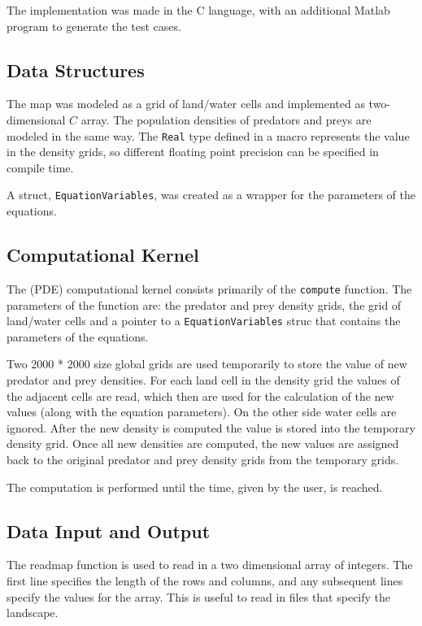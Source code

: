 \documentclass[12pt,a4paper]{article}
\begin{document}
The implementation was made in the C language, with an additional Matlab program to generate the test cases. 

\subsection{Data Structures}

The map was modeled as a grid of land/water cells and implemented as two-dimensional $C$ array. The population densities of predators and preys are modeled in the same way. The \texttt{Real} type defined in a macro represents the value in the density grids, so different floating point precision  can be specified in compile time. 

A struct, \texttt{EquationVariables}, was created as a wrapper for the parameters of the equations.

\subsection{Computational Kernel}

The (PDE) computational kernel consists primarily of the \texttt{compute} function. The parameters of the function are: the predator and prey density grids, the grid of land/water cells and a pointer to a \texttt{EquationVariables} struc that contains the parameters of the equations. 

Two 2000 * 2000 size global grids are used temporarily to store the value of new predator and prey densities. For each land cell in the density grid the values of the adjacent cells are read, which then are used for the calculation of the new values (along with the equation parameters). On the other side water cells are ignored. After the new density is computed the value is stored into the temporary density grid. Once all new densities are computed, the new values are assigned back to the original predator and prey density grids from the temporary grids.

The computation is performed until the time, given by the user, is reached.


\subsection{Data Input and Output}

The readmap function is used to read in a two dimensional array of integers. The first line specifies the length of the rows and columns, and any subsequent lines specify the values for the array. This is useful to read in files that specify the landscape.
\end{document}
